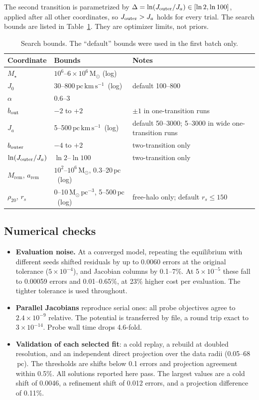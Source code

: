 \documentclass[11pt,a4paper]{article}
\newcommand{\Msun}{\ensuremath{\mathrm{M}_\odot}\xspace}
\newcommand{\pc}{\ensuremath{\,\mathrm{pc}}\xspace}
\newcommand{\Jact}{\ensuremath{\,\mathrm{pc\,km\,s^{-1}}}\xspace}
\newcommand{\remn}{\mathrm{rem}}
\begin{document}
The second transition is parametrized by $\Delta=\ln(J_{\rm outer}/J_a)\in[\ln2,\ln100]$,
applied after all other coordinates, so $J_{\rm outer}>J_a$ holds for every
trial. The search bounds are listed in Table~\ref{tab:bounds}. They are
optimizer limits, not priors.

\begin{table}[htbp]
\centering\small
\caption{Search bounds. The ``default'' bounds were used in the first batch
only.}
\label{tab:bounds}
\begin{tabular}{lll}
\toprule
Coordinate & Bounds & Notes\\
\midrule
$M_\star$ & $10^6$--$6\times10^6\,\Msun$ (log) & \\
$J_0$ & 30--800\Jact\ (log) & default 100--800\\
$\alpha$ & 0.6--3 & \\
$b_{\rm out}$ & $-2$ to $+2$ & $\pm1$ in one-transition runs\\
$J_a$ & 5--500\Jact\ (log) & default 50--3000; 5--3000 in wide one-transition runs\\
$b_{\rm outer}$ & $-4$ to $+2$ & two-transition only\\
$\ln(J_{\rm outer}/J_a)$ & $\ln2$--$\ln100$ & two-transition only\\
$M_\remn$, $a_\remn$ & $10^2$--$10^6\,\Msun$, 0.3--20\pc\ (log) & \\
$\rho_{20}$, $r_s$ & 0--10\,$\Msun\pc^{-3}$, 5--500\pc\ (log) & free-halo only; default $r_s\le150$\\
\bottomrule
\end{tabular}
\end{table}

\subsection{Numerical checks}
\label{sec:numerics}

\begin{itemize}
\item \textbf{Evaluation noise.} At a converged model, repeating the
  equilibrium with different seeds shifted residuals by up to 0.0060 errors at
  the original tolerance ($5\times10^{-4}$), and Jacobian columns by 0.1--7\%.
  At $5\times10^{-5}$ these fall to 0.00059 errors and 0.01--0.65\%, at 23\%
  higher cost per evaluation. The tighter tolerance is used throughout.
\item \textbf{Parallel Jacobians} reproduce serial ones: all probe objectives
  agree to $2.4\times10^{-9}$ relative. The potential is transferred by file,
  a round trip exact to $3\times10^{-14}$. Probe wall time drops 4.6-fold.
\item \textbf{Validation of each selected fit}: a cold replay, a rebuild at
  doubled resolution, and an independent direct projection over the data
  radii (0.05--68\pc). The thresholds are shifts below 0.1 errors and
  projection agreement within 0.5\%. All solutions reported here pass. The
  largest values are a cold shift of 0.0046, a refinement shift of 0.012
  errors, and a projection difference of 0.11\%.
\end{itemize}
\end{document}
